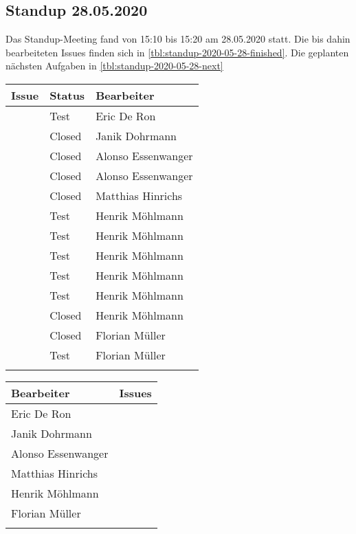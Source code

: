 	\subsection{Standup 28.05.2020}
	Das Standup-Meeting fand von 15:10 bis 15:20 am 28.05.2020 statt. Die bis dahin bearbeiteten Issues finden sich in \autoref{tbl:standup-2020-05-28-finished}. Die geplanten nächsten Aufgaben in \autoref{tbl:standup-2020-05-28-next}
		\begin{tabularx}{0.75\textwidth}{c|X|X}
			Issue & Status & Bearbeiter\\
			\hline
			\issueref{58}	& Test	& Eric De Ron\\
			\issueref{63}	& Closed	& Janik Dohrmann\\
			\issueref{63}	& Closed	& Alonso Essenwanger\\
			\issueref{55}	& Closed	& Alonso Essenwanger\\
			\issueref{58}	& Closed	& Matthias Hinrichs\\
			\issueref{62}	& Test		& Henrik Möhlmann\\
			\issueref{63}	& Test		& Henrik Möhlmann\\
			\issueref{46}	& Test		& Henrik Möhlmann\\
			\issueref{55}	& Test		& Henrik Möhlmann\\
			\issueref{58}	& Test		& Henrik Möhlmann\\
			\issueref{67}	& Closed	& Henrik Möhlmann\\
			\issueref{62}	& Closed	& Florian Müller\\
			\issueref{67}	& Test		& Florian Müller\\
			\hline
			\caption{bearbeitete Issues}
			\label{tbl:standup-2020-05-28-finished}
		\end{tabularx}
		\begin{tabularx}{0.75\textwidth}{X|X}
			Bearbeiter & Issues\\
			\hline
			Eric De Ron			& \issueref{69}\\
			Janik Dohrmann		& \\
			Alonso Essenwanger	& \\
			Matthias Hinrichs	& \\
			Henrik Möhlmann		& \issueref{68}\\
			Florian Müller		& \\
			\hline
			\caption{nächste Aufgaben}
			\label{tbl:standup-2020-05-28-next}
		\end{tabularx}

